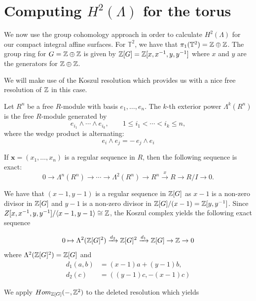 \section{Computing $H^2(\Lambda)$ for the torus}
We now use the group cohomology approach in order to calculate $H^2(\Lambda)$
for our compact integral affine surfaces. For $\mathbb{T}^2$, we have that
$\pi_1(\mathbb{T}^2) = \mathbb{Z} \oplus \mathbb{Z}$. The group ring for $G = \mathbb{Z} \oplus \mathbb{Z}$ is
given by $\mathbb{Z}[G] = \mathbb{Z}[x,x^{-1}, y, y^{-1}]$ where $x$ and $y$ are the generators
for $\mathbb{Z} \oplus \mathbb{Z}$.

We will make use of the Koszul resolution which provides us with a nice free
resolution of $\mathbb{Z}$ in this case.

\begin{definition}
    Let \(R^n\) be a free \(R\)-module with basis \(e_1,\dots,e_n\). The
    \(k\)-th exterior power \(\Lambda^k(R^n)\) is the free \(R\)-module generated by
    \[
        e_{i_1}\wedge \cdots \wedge e_{i_k},
        \qquad
        1 \le i_1 < \cdots < i_k \le n,
    \]
    where the wedge product is alternating:
    \[
        e_i \wedge e_j = -\, e_j \wedge e_i
    \]
\end{definition}

\begin{lemma}
    If $\textbf{x} = (x_1, \dots , x_n)$ is a regular sequence in \(R\), then the following sequence is exact:
    \[
        0 \longrightarrow \Lambda^n(R^n)
        \longrightarrow \cdots
        \longrightarrow \Lambda^2(R^n)
        \longrightarrow R^n
        \xrightarrow{x}
        R
        \longrightarrow R/I
        \longrightarrow 0.
    \]
\end{lemma}

We have that $(x-1, y-1)$ is a regular sequence in $\mathbb{Z}[G]$ as $x-1$ is a
non-zero divisor in $\mathbb{Z}[G]$ and $y-1$ is a non-zero divisor in $\mathbb{Z}[G]/(x-1) =
    \mathbb{Z}[y, y^{-1}]$. Since $Z[x,x^{-1}, y, y^{-1}]/\langle x-1, y-1 \rangle \cong
    \mathbb{Z}$, the Koszul complex yields the following exact sequence

$$
    0 \mapsto \Lambda^2(\mathbb{Z}[G]^2) \xrightarrow{d_2} \mathbb{Z}[G]^2 \xrightarrow{d_1} \mathbb{Z}[G] \to \mathbb{Z} \to 0
$$
where $\Lambda^2(\mathbb{Z}[G]^2) = \mathbb{Z}[G]$ and
\begin{align*}
    d_1(a,b) & = (x-1)a + (y-1)b,   \\
    d_2(c)   & = ((y-1)c , -(x-1)c)
\end{align*}

We apply $Hom_{\mathbb{Z}[G]}(-, \mathbb{Z}^2)$ to the deleted resolution which yields

